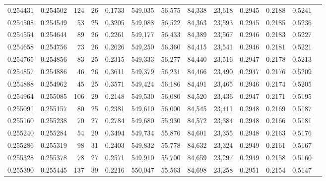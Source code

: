 \begin{tabular}{rrrrrrrrrrrrr}
0.254431 & 0.254502 & 124 &  26 &                                     0.1733 & 549,035 &  56,575 &  84,338 &  23,618 & 0.2945 & 0.2188 & 0.5241 \\
0.254508 & 0.254549 &  53 &  25 &                                     0.3205 & 549,088 &  56,522 &  84,363 &  23,593 & 0.2945 & 0.2185 & 0.5236 \\
0.254554 & 0.254644 &  89 &  26 &                                     0.2261 & 549,177 &  56,433 &  84,389 &  23,567 & 0.2946 & 0.2183 & 0.5227 \\
0.254658 & 0.254756 &  73 &  26 &                                     0.2626 & 549,250 &  56,360 &  84,415 &  23,541 & 0.2946 & 0.2181 & 0.5221 \\
0.254765 & 0.254856 &  83 &  25 &                                     0.2315 & 549,333 &  56,277 &  84,440 &  23,516 & 0.2947 & 0.2178 & 0.5213 \\
0.254857 & 0.254886 &  46 &  26 &                                     0.3611 & 549,379 &  56,231 &  84,466 &  23,490 & 0.2947 & 0.2176 & 0.5209 \\
0.254888 & 0.254962 &  45 &  25 &                                     0.3571 & 549,424 &  56,186 &  84,491 &  23,465 & 0.2946 & 0.2174 & 0.5205 \\
0.254964 & 0.255085 & 106 &  29 &                                     0.2148 & 549,530 &  56,080 &  84,520 &  23,436 & 0.2947 & 0.2171 & 0.5195 \\
0.255091 & 0.255157 &  80 &  25 &                                     0.2381 & 549,610 &  56,000 &  84,545 &  23,411 & 0.2948 & 0.2169 & 0.5187 \\
0.255160 & 0.255238 &  70 &  27 &                                     0.2784 & 549,680 &  55,930 &  84,572 &  23,384 & 0.2948 & 0.2166 & 0.5181 \\
0.255240 & 0.255284 &  54 &  29 &                                     0.3494 & 549,734 &  55,876 &  84,601 &  23,355 & 0.2948 & 0.2163 & 0.5176 \\
0.255286 & 0.255319 &  98 &  31 &                                     0.2403 & 549,832 &  55,778 &  84,632 &  23,324 & 0.2949 & 0.2161 & 0.5167 \\
0.255328 & 0.255378 &  78 &  27 &                                     0.2571 & 549,910 &  55,700 &  84,659 &  23,297 & 0.2949 & 0.2158 & 0.5160 \\
0.255390 & 0.255445 & 137 &  39 &                                     0.2216 & 550,047 &  55,563 &  84,698 &  23,258 & 0.2951 & 0.2154 & 0.5147 \\

\end{tabular}
